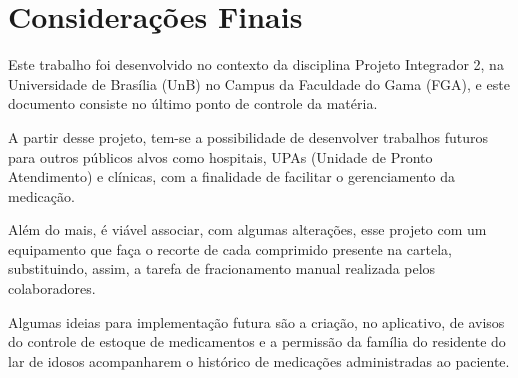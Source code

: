 \chapter[Considerações Finais]{Considerações Finais}

Este trabalho foi desenvolvido no contexto da disciplina Projeto Integrador 2, na Universidade de Brasília (UnB) no Campus da Faculdade do Gama (FGA), e este documento consiste no último ponto de controle da matéria. 


A partir desse projeto, tem-se a possibilidade de desenvolver trabalhos futuros para outros públicos alvos como hospitais, UPAs (Unidade de Pronto Atendimento) e clínicas, com a finalidade de facilitar o gerenciamento da medicação. 

Além do mais, é viável associar, com algumas alterações, esse projeto com um equipamento que faça o recorte de cada comprimido presente na cartela, substituindo, assim, a tarefa de fracionamento manual realizada pelos colaboradores. 

Algumas ideias para implementação futura são a criação, no aplicativo, de avisos do controle de estoque de medicamentos e a permissão da família do residente do lar de idosos acompanharem o histórico de medicações administradas ao paciente.


